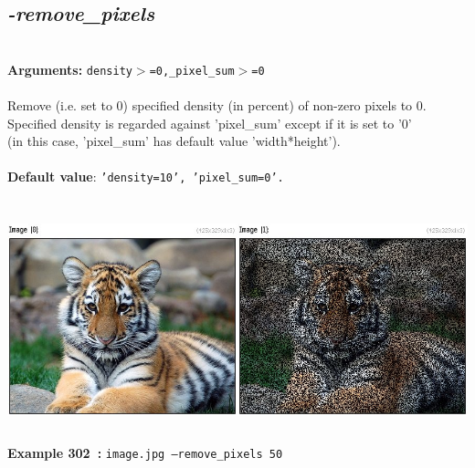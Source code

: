 \documentclass[a4paper,11pt,twoside]{book}
\begin{document}
\subsection{\emph{-remove\_pixels} }\vspace*{-0.5em}
~\\\textbf{Arguments: } 
{\small \texttt{density$>$=0,\_pixel\_sum$>$=0}}\\~\\
Remove (i.e. set to 0) specified density (in percent) of non-zero pixels to 0.
~\\Specified density is regarded against 'pixel\_sum' except if it is set to '0'
~\\(in this case, 'pixel\_sum' has default value 'width*height').
~\\~\\\textbf{Default value}: {\small \texttt{'density=10', 'pixel\_sum=0'.}}
\begin{center}\includegraphics[keepaspectratio=true,height=7cm,width=\textwidth]{img/gmic_def302.jpg}\\
{\footnotesize \textbf{Example 302~:} \texttt{image.jpg --remove\_pixels 50}}
\end{center}
\end{document}
